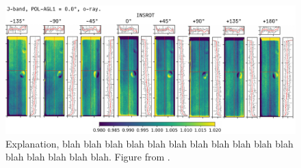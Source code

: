 \begin{figure} [!ph]
  \begin{center}
    \includegraphics[width=\linewidth]{figs/flatinsrot.pdf}
  \end{center}
  \caption[The $ r_1 $ ratio map for J-band with HWP rotator angle $ 0^\circ $ and o-ray region only.]{Explanation, blah blah blah blah blah blah blah blah blah blah blah blah blah blah blah blah. Figure from \cite{2022_SAG_NICpolpy}.}
  \label{fig:flatinsrot}
\end{figure}



